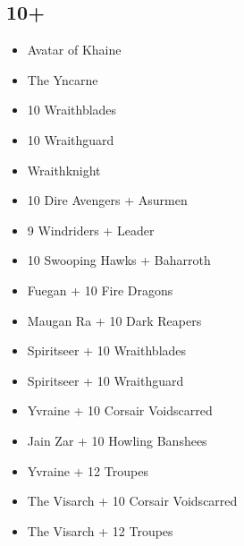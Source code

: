 \documentclass{HordeModeTarot}
\begin{document}
\begin{multicols}{2}
\subsection*{10+}

\begin{itemize}[leftmargin=*]
\item[] Avatar of Khaine
\item[] The Yncarne
\item[] 10 Wraithblades
\item[] 10 Wraithguard
\item[] Wraithknight
\item[] 10 Dire Avengers + Asurmen
\item[] 9 Windriders + Leader
\item[] 10 Swooping Hawks + Baharroth
\item[] Fuegan + 10 Fire Dragons
\item[] Maugan Ra + 10 Dark Reapers
\item[] Spiritseer + 10 Wraithblades
\item[] Spiritseer + 10 Wraithguard
\item[] Yvraine + 10 Corsair Voidscarred
\item[] Jain Zar + 10 Howling Banshees
\item[] Yvraine + 12 Troupes
\item[] The Visarch + 10 Corsair Voidscarred
\item[] The Visarch + 12 Troupes
\end{itemize}


\end{multicols}
\end{document}
